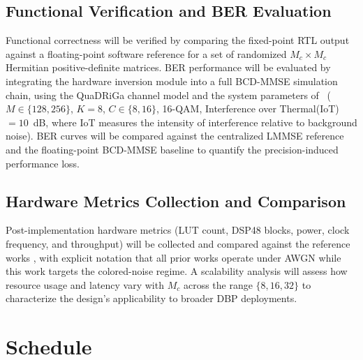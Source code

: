 \documentclass[12pt]{article}
\begin{document}
\subsection{Functional Verification and BER Evaluation}

Functional correctness will be verified by comparing the fixed-point
RTL output against a floating-point software reference for a set of
randomized $M_c \times M_c$ Hermitian positive-definite matrices. BER
performance will be evaluated by integrating the hardware inversion module
into a full BCD-MMSE simulation chain, using the QuaDRiGa channel model \cite{quadriga} 
and the system parameters of~\cite{zhao2025jsac} ($M \in \{128, 256\}$,
$K = 8$, $C \in \{8, 16\}$, 16-QAM, Interference over Thermal(IoT) $= 10$~dB,  where IoT measures the intensity of interference
relative to background noise). BER curves will be
compared against the centralized LMMSE reference and the floating-point
BCD-MMSE baseline to quantify the precision-induced performance loss.


\subsection{Hardware Metrics Collection and Comparison}

Post-implementation hardware metrics (LUT count, DSP48 blocks,
power, clock frequency, and throughput) will be collected and compared
against the reference works \cite{wang2021tlbdinsa, kulkarni2021newton, li2019fdlama},  with
explicit notation that all prior works operate under AWGN while this
work targets the colored-noise regime. A scalability analysis will assess
how resource usage and latency vary with $M_c$ across the range $\{8,
16, 32\}$ to characterize the design's applicability to broader DBP
deployments.



\section{Schedule}
%
\vspace{0.1cm}
\renewcommand{\arraystretch}{1.3}
\newcommand{\X}{\cellcolor{gray!70}}
\newcommand{\E}{\cellcolor{white}}
\end{document}
